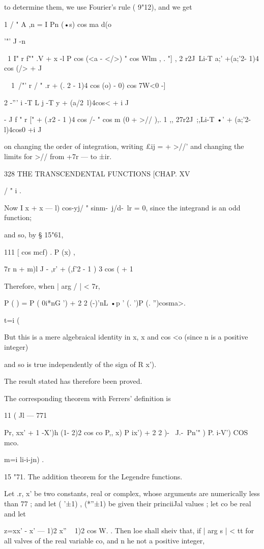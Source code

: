 {{{to determine them, we use Fourier's rule ( 9"12), and we get

1 / " A ,n = I Pn (•s) cos ma d(o

'"' J -n

\ 1 I" r f"" .V + x -l P cos (<a - </>) " cos Wlm , . "] , 2 r2J\ Li-T
a;' +(a;'2- 1)4 cos (/> + J

\ \ 1\ /"' r / " .r + (. 2 - 1)4 cos (o) - 0) cos 7W<0 -]

2 -''' i -T L j -T y + (a/2\ l)4cos< + i J

- J f " r [" + (.r2 - 1 )4 cos /- " cos m (0 + >// ),. 1 ,, 27r2J\
;,Li-T •' + (a;'2-l)4cos0 +i J

on changing the order of integration, writing £ij = + >//' and
changing the limits for >// from +7r — to ±ir.

328 THE TRANSCENDENTAL FUNCTIONS [CHAP. XV

/ " i .

Now I x + x — l) cos-yj/ " sinm-\ j/d-\ lr = 0, since the integrand is
an odd function;

and so, by § 15"61,

111 [ cos mcf) . P (x) ,

7r n + m)l J - ,r' + (,f'2 - 1 ) 3 cos ( + 1

Therefore, when | arg / | < 7r,

P ( ) = P ( 0i*nG ') + 2 2 (-)'nL •p ' (. ')P (. '')cosma>.

 t=i (%

But this is a mere algebraical identity in x, x and cos <o (since n is
a positive integer)

and so is true independently of the sign of R x').

The result stated has therefore been proved.

The corresponding theorem with Ferrers' definition is

11 ( Jl — 771

Pr, xx' + 1 -X')h (1- 2)2 cos co P,, x) P ix') + 2 2 )- ~J.-\ Pn'" )
P. i-V') COS mco.

m=i li-i-jn) .

15 "71. The addition theorem for the Legendre functions.

Let .r, x' be two constants, real or complex, whose arguments are
numerically less than 77 ; and let ( '±1) , (*''±1) be given their
princiiJal values ; let co be real and let

z=xx' - x' — 1)2 x'' ~ 1)2 cos W. . Then loe shall sheiv that, if |
arg s | < tt for all valves of the real variable co, and n he not a
positive integer,

}}}
